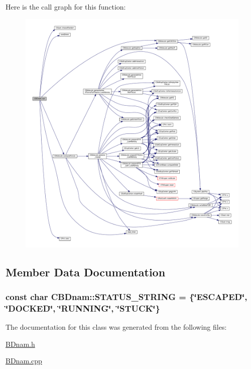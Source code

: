 Here is the call graph for this function\-:\nopagebreak
\begin{figure}[H]
\begin{center}
\leavevmode
\includegraphics[width=350pt]{classCBDnam_a07205701ed2267dc0457a4d621bb8aa8_cgraph}
\end{center}
\end{figure}




\subsection{Member Data Documentation}
\hypertarget{classCBDnam_a0ca7d3cb1a694687bc249cb90bd549f0}{
\subsubsection[{S\-T\-A\-T\-U\-S\-\_\-\-S\-T\-R\-I\-N\-G}]{\setlength{\rightskip}{0pt plus 5cm}const char C\-B\-Dnam\-::\-S\-T\-A\-T\-U\-S\-\_\-\-S\-T\-R\-I\-N\-G = \{\char`\"{}E\-S\-C\-A\-P\-E\-D\char`\"{}, \char`\"{}{\bf D\-O\-C\-K\-E\-D}\char`\"{}, \char`\"{}{\bf R\-U\-N\-N\-I\-N\-G}\char`\"{}, \char`\"{}{\bf S\-T\-U\-C\-K}\char`\"{}\}\hspace{0.3cm}{\ttfamily [static]}}}\label{classCBDnam_a0ca7d3cb1a694687bc249cb90bd549f0}


The documentation for this class was generated from the following files\-:\begin{DoxyCompactItemize}
\item 
\hyperlink{BDnam_8h}{B\-Dnam.\-h}\item 
\hyperlink{BDnam_8cpp}{B\-Dnam.\-cpp}\end{DoxyCompactItemize}
